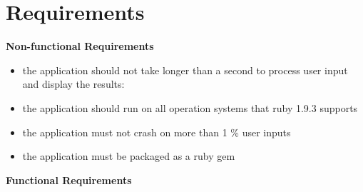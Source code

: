 \documentclass[11pt]{article}
\begin{document}
\section{Requirements}

\textbf{Non-functional Requirements}
\begin{itemize}

\item the application should not take longer than a second to process user input and display the results:

\item the application should run on all operation systems that ruby 1.9.3 supports
\item the application must not crash on more than 1 \% user inputs
\item the application must be packaged as a ruby gem

\end{itemize}
\textbf{Functional Requirements}
\end{document}
